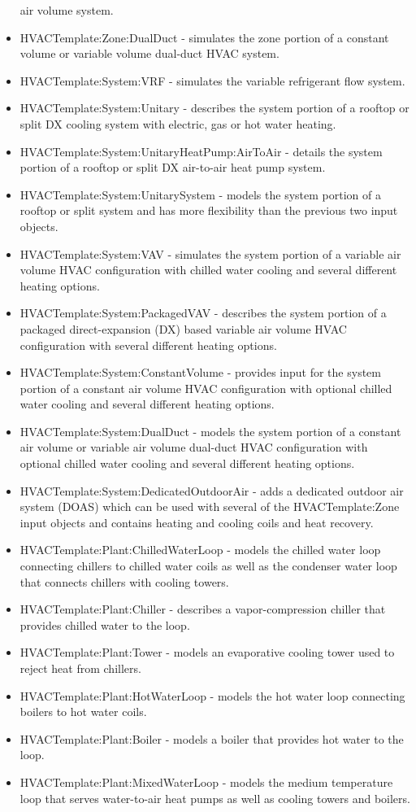 \begin{itemize}
air volume system.
\item HVACTemplate:Zone:DualDuct - simulates the zone portion of a constant
volume or variable volume dual-duct HVAC system.
\item HVACTemplate:System:VRF - simulates the variable refrigerant flow
system.
\item HVACTemplate:System:Unitary - describes the system portion of a rooftop
or split DX cooling system with electric, gas or hot water heating.
\item HVACTemplate:System:UnitaryHeatPump:AirToAir - details the system
portion of a rooftop or split DX air-to-air heat pump system.
\item HVACTemplate:System:UnitarySystem - models the system portion of a
rooftop or split system and has more flexibility than the previous
two input objects.
\item HVACTemplate:System:VAV - simulates the system portion of a variable
air volume HVAC configuration with chilled water cooling and several
different heating options.
\item HVACTemplate:System:PackagedVAV - describes the system portion of
a packaged direct-expansion (DX) based variable air volume HVAC configuration
with several different heating options.
\item HVACTemplate:System:ConstantVolume - provides input for the system
portion of a constant air volume HVAC configuration with optional
chilled water cooling and several different heating options.
\item HVACTemplate:System:DualDuct - models the system portion of a constant
air volume or variable air volume dual-duct HVAC configuration with
optional chilled water cooling and several different heating options.
\item HVACTemplate:System:DedicatedOutdoorAir - adds a dedicated outdoor
air system (DOAS) which can be used with several of the HVACTemplate:Zone
input objects and contains heating and cooling coils and heat recovery.
\item HVACTemplate:Plant:ChilledWaterLoop - models the chilled water loop
connecting chillers to chilled water coils as well as the condenser
water loop that connects chillers with cooling towers.
\item HVACTemplate:Plant:Chiller - describes a vapor-compression chiller
that provides chilled water to the loop.
\item HVACTemplate:Plant:Tower - models an evaporative cooling tower used
to reject heat from chillers.
\item HVACTemplate:Plant:HotWaterLoop - models the hot water loop connecting
boilers to hot water coils.
\item HVACTemplate:Plant:Boiler - models a boiler that provides hot water
to the loop.
\item HVACTemplate:Plant:MixedWaterLoop - models the medium temperature
loop that serves water-to-air heat pumps as well as cooling towers
and boilers.
\end{itemize}
